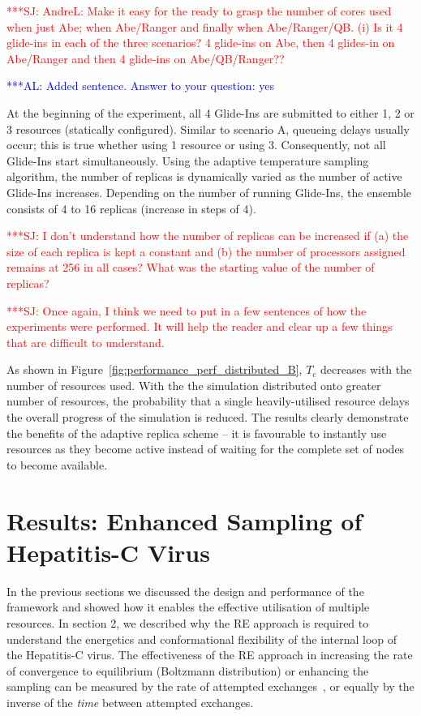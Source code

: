 \documentclass{rspublic}
\newcommand{\alnote}[1]{ {\textcolor{blue} { ***AL: #1 }}}
\newcommand{\jhanote}[1]{ {\textcolor{red} { ***SJ: #1 }}}
\newcommand{\alnote}[1]{}
\newcommand{\jhanote}[1]{}
\begin{document}
\jhanote{AndreL: Make it easy for the ready to grasp the number of
  cores used when just Abe; when Abe/Ranger and finally when
  Abe/Ranger/QB. (i) Is it 4 glide-ins in each of the three scenarios?
  4 glide-ins on Abe, then 4 glides-in on Abe/Ranger and then 4
  glide-ins on Abe/QB/Ranger??}

\alnote{Added sentence. Answer to your question: yes}
              
At the beginning of the experiment, all 4 Glide-Ins are submitted to
either 1, 2 or 3 resources (statically configured).  Similar to
scenario A, queueing delays usually occur; this is true whether using
1 resource or using 3.  Consequently, not all Glide-Ins start
simultaneously.  Using the adaptive temperature sampling algorithm,
the number of replicas is dynamically varied as the number of active
Glide-Ins increases. Depending on the number of running Glide-Ins, the
ensemble consists of 4 to 16 replicas (increase in
steps of 4).

\jhanote{I don't understand how the number of replicas can be
  increased if (a) the size of each replica is kept a constant and (b)
  the number of processors assigned remains at 256 in all cases? What
  was the starting value of the number of replicas?}  

\jhanote{Once again, I think we need to put in a few sentences of how
  the experiments were performed. It will help the reader and clear up
  a few things that are difficult to understand.}

As shown in Figure~\ref{fig:performance_perf_distributed_B}, $T_{c}$
decreases with the number of resources used.  With the the simulation
distributed onto greater number of resources, the probability that a
single heavily-utilised resource delays the overall progress of the
simulation is reduced.
The results clearly demonstrate the benefits of the adaptive replica
scheme -- it is favourable to instantly use resources as they become
active instead of waiting for the complete set of nodes to become
available.  

\section{Results: Enhanced Sampling of Hepatitis-C Virus}
In the previous sections we discussed the design and performance
of the framework and showed how it enables the effective utilisation of
multiple resources. In section 2, we described why the RE approach is
required to understand the energetics and conformational flexibility
of the internal loop of the Hepatitis-C virus. The effectiveness of
the RE approach in increasing the rate of convergence to equilibrium
(Boltzmann distribution) or enhancing the sampling can be measured by
the rate of attempted exchanges~\citep{Lei:2007xe}, or equally by the
inverse of the {\it time} between attempted exchanges.
\end{document}
